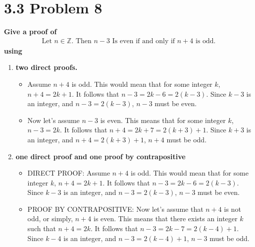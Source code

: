 \documentclass[10pt]{article}
\begin{document}
\section{3.3 Problem 8}
\textbf{Give a proof of
    \begin{align*}
        \text{Let } n \in \mathbb{Z} \text{.  Then } n - 3 \text{ Is even if and only if } n + 4 \text{ is odd.}
    \end{align*}
using}

\begin{enumerate}[label=(\alph*)]

    \item \textbf{two direct proofs.}

        \begin{itemize}
            \item Assume $n + 4$ is odd.  This would mean that for some integer $k$, $n + 4 = 2k + 1$.  It follows that
                $n - 3 = 2k - 6 = 2(k - 3)$.  Since $k - 3$ is an integer, and $n - 3 = 2(k - 3)$, $n - 3$ must be even.
        \end{itemize}

        \begin{itemize}
            \item Now let's assume $n - 3$ is even.  This means that for some integer $k$, $n - 3 = 2k$.  It follows that
                $n + 4 = 2k + 7 = 2(k + 3) + 1$.  Since $k + 3$ is an integer, and $n + 4 = 2(k + 3) + 1$, $n + 4$ must be odd.
        \end{itemize}


    \item \textbf{one direct proof and one proof by contrapositive}

        \begin{itemize}
            \item DIRECT PROOF: Assume $n + 4$ is odd.  This would mean that for some integer $k$, $n + 4 = 2k + 1$.  It follows 
                that $n - 3 = 2k - 6 = 2(k - 3)$.  Since $k - 3$ is an integer, and $n - 3 = 2(k - 3)$, $n - 3$ must be even.
        \end{itemize}

        \begin{itemize}
            \item PROOF BY CONTRAPOSITIVE: Now let's assume that $n + 4$ is not odd, or simply, $n + 4$ is even.  This means that 
                there exists an integer $k$ such that $n + 4 = 2k$.  It follows that $n - 3 = 2k - 7 = 2(k - 4) + 1$.  Since $k - 4$
                is an integer, and $n - 3 = 2(k - 4) + 1$, $n - 3$ must be odd.
        \end{itemize}



\end{enumerate}
\end{document}
